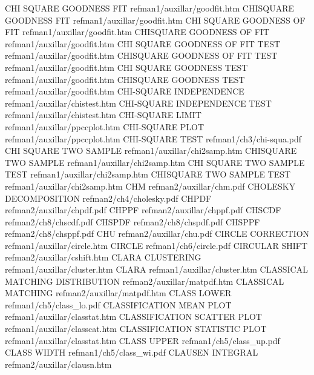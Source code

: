 CHI SQUARE GOODNESS FIT                 refman1/auxillar/goodfit.htm
CHISQUARE GOODNESS FIT                  refman1/auxillar/goodfit.htm
CHI SQUARE GOODNESS OF FIT              refman1/auxillar/goodfit.htm
CHISQUARE GOODNESS OF FIT               refman1/auxillar/goodfit.htm
CHI SQUARE GOODNESS OF FIT TEST         refman1/auxillar/goodfit.htm
CHISQUARE GOODNESS OF FIT TEST          refman1/auxillar/goodfit.htm
CHI SQUARE GOODNESS TEST                refman1/auxillar/goodfit.htm
CHISQUARE GOODNESS TEST                 refman1/auxillar/goodfit.htm
CHI-SQUARE INDEPENDENCE                 refman1/auxillar/chistest.htm
CHI-SQUARE INDEPENDENCE TEST            refman1/auxillar/chistest.htm
CHI-SQUARE LIMIT                        refman1/auxillar/ppccplot.htm
CHI-SQUARE PLOT                         refman1/auxillar/ppccplot.htm
CHI-SQUARE TEST                         refman1/ch3/chi-squa.pdf
CHI SQUARE TWO SAMPLE                   refman1/auxillar/chi2samp.htm
CHISQUARE TWO SAMPLE                    refman1/auxillar/chi2samp.htm
CHI SQUARE TWO SAMPLE TEST              refman1/auxillar/chi2samp.htm
CHISQUARE TWO SAMPLE TEST               refman1/auxillar/chi2samp.htm
CHM                                     refman2/auxillar/chm.pdf
CHOLESKY DECOMPOSITION                  refman2/ch4/cholesky.pdf
CHPDF                                   refman2/auxillar/chpdf.pdf
CHPPF                                   refman2/auxillar/chppf.pdf
CHSCDF                                  refman2/ch8/chscdf.pdf
CHSPDF                                  refman2/ch8/chspdf.pdf
CHSPPF                                  refman2/ch8/chsppf.pdf
CHU                                     refman2/auxillar/chu.pdf
CIRCLE CORRECTION                       refman1/auxillar/circle.htm
CIRCLE                                  refman1/ch6/circle.pdf
CIRCULAR SHIFT                          refman2/auxillar/cshift.htm
CLARA CLUSTERING                        refman1/auxillar/cluster.htm
CLARA                                   refman1/auxillar/cluster.htm
CLASSICAL MATCHING DISTRIBUTION         refman2/auxillar/matpdf.htm
CLASSICAL MATCHING                      refman2/auxillar/matpdf.htm
CLASS LOWER                             refman1/ch5/class_lo.pdf
CLASSIFICATION MEAN PLOT                refman1/auxillar/classtat.htm
CLASSIFICATION SCATTER PLOT             refman1/auxillar/classcat.htm
CLASSIFICATION STATISTIC PLOT           refman1/auxillar/classtat.htm
CLASS UPPER                             refman1/ch5/class_up.pdf
CLASS WIDTH                             refman1/ch5/class_wi.pdf
CLAUSEN INTEGRAL                        refman2/auxillar/clausn.htm
